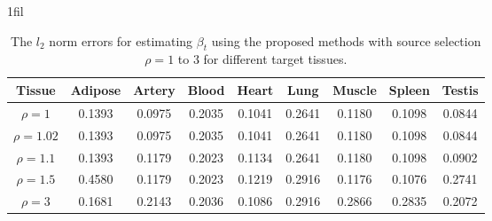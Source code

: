 \documentclass[12pt]{article}
\makeatletter
\newcommand*{\centerfloat}{%
  \parindent \z@
  \leftskip \z@ \@plus 1fil \@minus \marginparwidth
  \rightskip \leftskip
  \parfillskip \z@skip}
\makeatother
\begin{document}
\begin{table}[ht]
\renewcommand{\arraystretch}{0.85}
    \centerfloat
    \caption{The $l_2$ norm errors for estimating $\beta_t$ using the proposed methods with source selection $\rho=1$ to $3$ for different target tissues.}
    \label{table:diff_rho}
    \begin{tabular}{ccccccccc}
        \toprule
        \textbf{Tissue} & Adipose  &Artery & Blood &Heart &  Lung & Muscle & Spleen&  Testis\\
        \midrule
        $\rho=1$ & 0.1393& 0.0975 & 0.2035& 0.1041& 0.2641 & 0.1180 &0.1098& 0.0844\\
        {$\rho=1.02$} & 0.1393& 0.0975 & 0.2035& 0.1041& 0.2641 & 0.1180 &0.1098& 0.0844\\
        {$\rho=1.1$} & 0.1393 & 0.1179 & 0.2023 & 0.1134 & 0.2641 & 0.1180 & 0.1098 & 0.0902\\
        {$\rho=1.5$} & 0.4580&0.1179  & 0.2023& 0.1219& 0.2916 & 0.1176 & 0.1076& 0.2741\\
        {$\rho=3$}  &0.1681 &  0.2143&0.2036 & 0.1086&0.2916 &  0.2866& 0.2835 & 0.2072\\
        \bottomrule
    \end{tabular}
\end{table}
\end{document}
